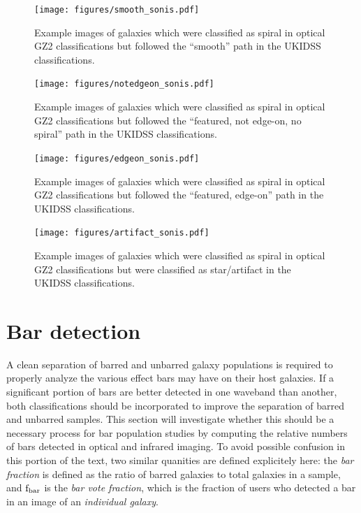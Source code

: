 \begin{figure}
\centering
\texttt{[image: figures/smooth\_sonis.pdf]}
\caption{Example images of galaxies which were classified as spiral in optical GZ2 classifications but followed the ``smooth'' path in the UKIDSS classifications.}
\label{fig:smooth}
\end{figure}

\begin{figure}
\centering
\texttt{[image: figures/notedgeon\_sonis.pdf]}
\caption{Example images of galaxies which were classified as spiral in optical GZ2 classifications but followed the ``featured, not edge-on, no spiral'' path in the UKIDSS classifications.}
\label{fig:notedgeon}
\end{figure}

 
\begin{figure}
\centering
\texttt{[image: figures/edgeon\_sonis.pdf]}
\caption{Example images of galaxies which were classified as spiral in optical GZ2 classifications but followed the ``featured, edge-on'' path in the UKIDSS classifications.}
\label{fig:edgeon}
\end{figure}

 
\begin{figure}
\centering
\texttt{[image: figures/artifact\_sonis.pdf]}
\caption{Example images of galaxies which were classified as spiral in optical GZ2 classifications but were classified as star/artifact in the UKIDSS classifications.}
\label{fig:artifact}
\end{figure}


\section{Bar detection}
A clean separation of barred and unbarred galaxy populations is required to properly analyze the various effect bars may have on their host galaxies. If a significant portion of bars are better detected in one waveband than another, both classifications should be incorporated to improve the separation of barred and unbarred samples. This section will investigate whether this should be a necessary process for bar population studies by computing the relative numbers of bars detected in optical and infrared imaging. To avoid possible confusion in this portion of the text, two similar quanities are defined explicitely here: the \emph{bar fraction} is defined as the ratio of barred galaxies to total galaxies in a sample, and $\rm f_{bar}$ is the \emph{bar vote fraction}, which is the fraction of users who detected a bar in an image of an \emph{individual galaxy}.

